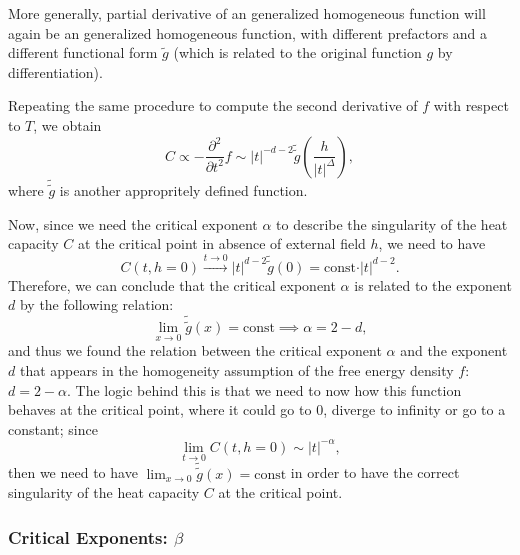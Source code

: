 \begin{remark}
    More generally, partial derivative of an generalized homogeneous function will again be an generalized homogeneous function, with different prefactors and a different functional form \(\tilde{g}\) (which is related to the original function \(g\) by differentiation).
\end{remark}

Repeating the same procedure to compute the second derivative of \(f\) with respect to \(T\), we obtain
\[
    C \propto - \frac{\partial^2}{\partial t^2} f \sim \vert t \vert^{-d-2} \tilde{\tilde{g}}\left(\frac{h}{\vert t \vert^{\Delta}}\right),
\]
where \(\tilde{\tilde{g}}\) is another appropritely defined function.

Now, since we need the critical exponent \(\alpha\) to describe the singularity of the heat capacity \(C\) at the critical point in absence of external field \(h\), we need to have
\[
    C(t, h=0) \xrightarrow{t \to 0} \vert t \vert^{d-2} \tilde{\tilde{g}}(0) = \text{const} \cdot \vert t \vert^{d-2}.
\]
Therefore, we can conclude that the critical exponent \(\alpha\) is related to the exponent \(d\) by the following relation:
\[
    \lim_{x \to 0} \tilde{\tilde{g}}(x) = \text{const} \implies \alpha = 2 - d,
\]
and thus we found the relation between the critical exponent \(\alpha\) and the exponent \(d\) that appears in the homogeneity assumption of the free energy density \(f\): \(d = 2 - \alpha\). The logic behind this is that we need to now how this function behaves at the critical point, where it could go to 0, diverge to infinity or go to a constant; since
\[
    \lim_{t \to 0} C (t, h=0) \sim \vert t \vert^{-\alpha},
\]
then we need to have \(\lim_{x \to 0} \tilde{\tilde{g}}(x) = \text{const}\) in order to have the correct singularity of the heat capacity \(C\) at the critical point.

\subsubsection{Critical Exponents: \(\beta\)}

